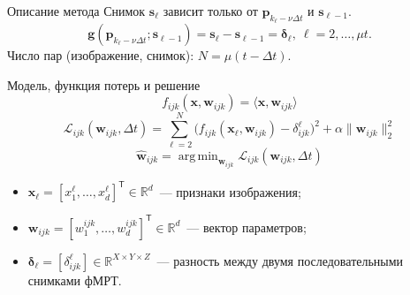 \documentclass{beamer}
\newcommand{\T}{^{\mathsf{T}}}
\DeclareMathOperator*{\argmin}{arg\,min}  %
\begin{document}
\begin{frame}{Описание метода}
    Снимок $\mathbf{s}_{\ell}$ зависит только от $\mathbf{p}_{k_\ell - \nu \Delta t}$ и $\mathbf{s}_{\ell-1}$.
	\begin{equation*}
		\label{eq4}
		\mathbf{g}(\mathbf{p}_{k_{\ell} - \nu \Delta t}; \mathbf{s}_{\ell-1}) = \mathbf{s}_{\ell} - \mathbf{s}_{\ell-1} = \bm{\delta}_{\ell}, \ \ell = 2, \ldots, \mu t.
	\end{equation*}
    Число пар (изображение, снимок): $N = \mu (t - \Delta t)$.
    \begin{block}{Модель, функция потерь и решение}
        \begin{equation*}
            \label{eq5}
            f_{ijk}(\mathbf{x}, \mathbf{w}_{ijk}) = \langle \mathbf{x}, \mathbf{w}_{ijk} \rangle
        \end{equation*}
        \begin{equation*}
            \label{eq6}
            \mathcal{L}_{ijk}(\mathbf{w}_{ijk}, \Delta t) = \sum\limits_{\ell = 2}^{N} \big(f_{ijk}(\mathbf{x}_{\ell}, \mathbf{w}_{ijk}) - \delta_{ijk}^{\ell} \big)^2 + \alpha \| \mathbf{w}_{ijk} \|_2^2
        \end{equation*}
        \begin{equation*}
            \label{eq7}
            \hat{\mathbf{w}}_{ijk} = \argmin_{\mathbf{w}_{ijk}} \mathcal{L}_{ijk}(\mathbf{w}_{ijk}, \Delta t)
        \end{equation*}
        \vspace{-0.5cm}
        \begin{itemize}
            \item $\mathbf{x}_{\ell} = [x^{\ell}_1, \ldots, x^{\ell}_{d}]\T \in \mathbb{R}^{d}$~--- признаки изображения;
            \item $\mathbf{w}_{ijk} = [w^{ijk}_1, \ldots, w^{ijk}_{d}]\T \in \mathbb{R}^{d}$~--- вектор параметров;
            \item $\bm{\delta}_{\ell} = [\delta^{\ell}_{ijk}] \in \mathbb{R}^{X \times Y \times Z}$~--- разность между двумя последовательными снимками фМРТ.
        \end{itemize}
    \end{block}
\end{frame}
\end{document}
